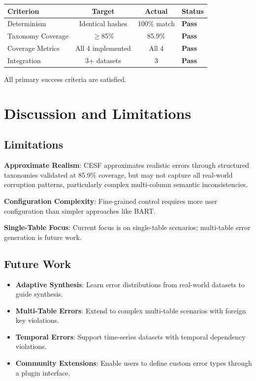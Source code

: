 \documentclass[11pt,a4paper]{article}
\begin{document}
\begin{table}[h]
\centering
\begin{tabular}{lccl}
\toprule
Criterion & Target & Actual & Status \\
\midrule
Determinism & Identical hashes & 100\% match & \textbf{Pass} \\
Taxonomy Coverage & $\geq$85\% & 85.9\% & \textbf{Pass} \\
Coverage Metrics & All 4 implemented & All 4 & \textbf{Pass} \\
Integration & 3+ datasets & 3 & \textbf{Pass} \\
\bottomrule
\end{tabular}
\end{table}

All primary success criteria are satisfied.

\section{Discussion and Limitations}
\label{sec:discussion}

\subsection{Limitations}

\textbf{Approximate Realism}: CESF approximates realistic errors through structured taxonomies validated at 85.9\% coverage, but may not capture all real-world corruption patterns, particularly complex multi-column semantic inconsistencies.

\textbf{Configuration Complexity}: Fine-grained control requires more user configuration than simpler approaches like BART.

\textbf{Single-Table Focus}: Current focus is on single-table scenarios; multi-table error generation is future work.

\subsection{Future Work}

\begin{itemize}
    \item \textbf{Adaptive Synthesis}: Learn error distributions from real-world datasets to guide synthesis.
    \item \textbf{Multi-Table Errors}: Extend to complex multi-table scenarios with foreign key violations.
    \item \textbf{Temporal Errors}: Support time-series datasets with temporal dependency violations.
    \item \textbf{Community Extensions}: Enable users to define custom error types through a plugin interface.
\end{itemize}
\end{document}
